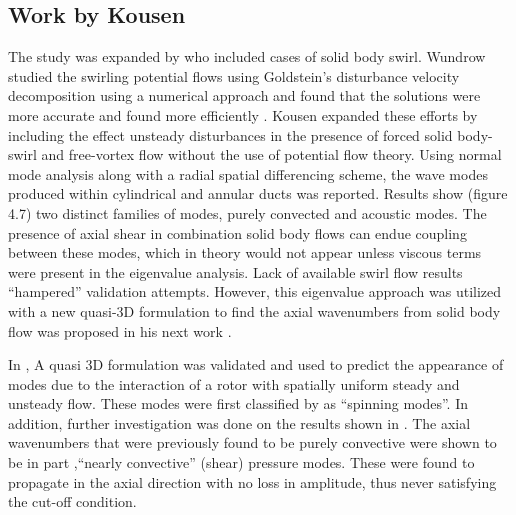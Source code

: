 \subsection{Work by Kousen}
The study was expanded by \cite{KERREBROCK1974,YURKOVICH1975} who
included cases of solid body swirl. Wundrow studied the swirling potential flows using Goldstein's disturbance velocity
decomposition \cite{Goldstein1978} using a numerical approach and found that the solutions
were more accurate and found more efficiently \cite{KERREBROCK1974}. Kousen expanded these efforts by including \cite{kousen1996pressure,kousen1995eigenmode} the effect unsteady disturbances in the presence of 
forced solid body-swirl and free-vortex flow without the use of potential flow theory. Using normal 
mode analysis along with a radial spatial differencing scheme, the wave modes produced within cylindrical and annular ducts was 
reported. Results show (figure 4.7) two distinct families of modes, purely convected and acoustic 
modes. The presence of axial shear in combination solid body flows can endue coupling between these modes, which 
in theory would not appear unless viscous terms were present in the eigenvalue analysis. Lack of available swirl flow 
results ``hampered'' validation attempts. However, this eigenvalue approach was utilized with a new quasi-3D 
formulation to find the axial wavenumbers from solid body flow was proposed in his next work . 

In \cite{kousen1995eigenmode}, A quasi 3D formulation was validated and used to predict 
the appearance of modes due to the interaction of a rotor with spatially 
uniform steady and unsteady flow. These modes were first classified by 
\cite{Tyler1962} as ``spinning modes''. In addition, further investigation was 
done on the results shown in \cite{kousen1995eigenmode}. The axial wavenumbers that 
were previously found to be purely convective were shown to be in part
,``nearly convective'' (shear) pressure modes. These were found to propagate in the 
axial direction with no loss in amplitude, thus never satisfying the cut-off condition. 

